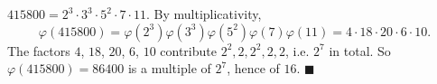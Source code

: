 $415800=2^3\cdot3^3\cdot5^2\cdot7\cdot11$. By multiplicativity,
\[\varphi(415800)=\varphi(2^3)\varphi(3^3)\varphi(5^2)\varphi(7)\varphi(11)=4\cdot18\cdot20\cdot6\cdot10.\]
The factors $4$, $18$, $20$, $6$, $10$ contribute $2^2,2,2^2,2,2$, i.e. $2^7$ in total. So $\varphi(415800)=86400$ is a multiple of $2^7$, hence of $16$. $\blacksquare$
